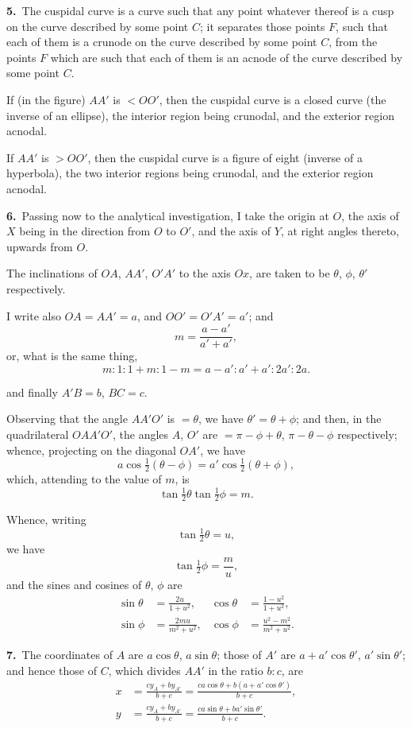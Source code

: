 \documentclass[11pt,a4paper]{article}
\begin{document}
\textbf{5.}\ The cuspidal curve is a curve such that any point whatever thereof is a cusp on the curve described by some point $C$; it separates those points $F$, such that each of them is a crunode on the curve described by some point $C$, from the points $F$ which are such that each of them is an acnode of the curve described by some point $C$.

If (in the figure) $AA'$ is $< OO'$, then the cuspidal curve is a closed curve (the inverse of an ellipse), the interior region being crunodal, and the exterior region acnodal.

If $AA'$ is $> OO'$, then the cuspidal curve is a figure of eight (inverse of a hyperbola), the two interior regions being crunodal, and the exterior region acnodal.

\textbf{6.}\ Passing now to the analytical investigation, I take the origin at $O$, the axis of $X$ being in the direction from $O$ to $O'$, and the axis of $Y$, at right angles thereto, upwards from $O$.

The inclinations of $OA$, $AA'$, $O'A'$ to the axis $Ox$, are taken to be $\theta$, $\phi$, $\theta'$ respectively.

I write also $OA = AA' = a$, and $OO' = O'A' = a'$; and
\[
m = \frac{a-a'}{a'+a'},
\]
or, what is the same thing,
\[
m : 1 : 1+m : 1-m = a-a' : a'+a' : 2a' : 2a.
\]

\newpage
\setcounter{page}{185}

\noindent and finally $A'B = b$, $BC = c$.

Observing that the angle $AA'O'$ is $= \theta$, we have $\theta' = \theta + \phi$; and then, in the quadrilateral $OAA'O'$, the angles $A$, $O'$ are $= \pi - \phi + \theta$, $\pi - \theta - \phi$ respectively; whence, projecting on the diagonal $OA'$, we have
\[
a \cos\tfrac{1}{2}(\theta - \phi) = a' \cos\tfrac{1}{2}(\theta + \phi),
\]
which, attending to the value of $m$, is
\[
\tan\tfrac{1}{2}\theta \tan\tfrac{1}{2}\phi = m.
\]

Whence, writing
\[
\tan\tfrac{1}{2}\theta = u,
\]
we have
\[
\tan\tfrac{1}{2}\phi = \frac{m}{u},
\]
and the sines and cosines of $\theta$, $\phi$ are
\begin{align*}
\sin\theta &= \frac{2u}{1+u^2}, & \cos\theta &= \frac{1-u^2}{1+u^2},\\
\sin\phi &= \frac{2mu}{m^2+u^2}, & \cos\phi &= \frac{u^2-m^2}{m^2+u^2}.
\end{align*}

\textbf{7.}\ The coordinates of $A$ are $a\cos\theta$, $a\sin\theta$; those of $A'$ are $a + a'\cos\theta'$, $a'\sin\theta'$; and hence those of $C$, which divides $AA'$ in the ratio $b:c$, are
\begin{align*}
x &= \frac{cy_A + by_{A'}}{b+c} = \frac{ca\cos\theta + b(a + a'\cos\theta')}{b+c},\\
y &= \frac{cy_A + by_{A'}}{b+c} = \frac{ca\sin\theta + ba'\sin\theta'}{b+c}.
\end{align*}
\end{document}
